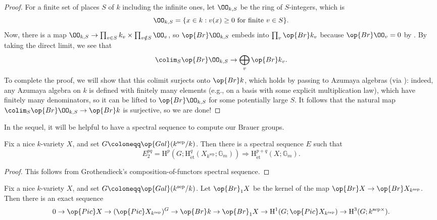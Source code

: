\documentclass[../notes.tex]{subfiles}
\begin{document}
\begin{proof}
	For a finite set of places $S$ of $k$ including the infinite ones, let $\OO_{k,S}$ be the ring of $S$-integers, which is
	\[\OO_{k,S}=\{x\in k:v(x)\ge0\text{ for finite }v\in S\}.\]
	Now, there is a map $\OO_{k,S}\to\prod_{v\in S}k_{v}\times\prod_{v\notin S}\OO_v$, so $\op{Br}\OO_{k,S}$ embeds into $\prod_v\op{Br}k_v$ because $\op{Br}\OO_v=0$ by . By taking the direct limit, we see that
	\[\colim_S\op{Br}\OO_{k,S}\to\bigoplus_{v}\op{Br}k_v.\]
	To complete the proof, we will show that this colimit surjects onto $\op{Br}k$, which holds by passing to Azumaya algebras (via ): indeed, any Azumaya algebra on $k$ is defined with finitely many elements (e.g., on a basis with some explicit multiplication law), which have finitely many denominators, so it can be lifted to $\op{Br}\OO_{k,S}$ for some potentially large $S$. It follows that the natural map $\colim_S\op{Br}\OO_{k,S}\to\op{Br}k$ is surjective, so we are done!
\end{proof}
In the sequel, it will be helpful to have a spectral sequence to compute our Brauer groups.
\begin{theorem} \label{thm:h-s-spectral}
	Fix a nice $k$-variety $X$, and set $G\coloneqq\op{Gal}(k^{\mathrm{sep}}/k)$. Then there is a spectral sequence $E$ such that
	\[E_2^{pq}=\mathrm H^p\left(G;\mathrm H^q_{\mathrm{\acute et}}(X_{k^{\mathrm{sep}}};\mathbb G_m)\right)\Rightarrow\mathrm H^{p+q}_{\mathrm{\acute et}}(X;\mathbb G_m).\]
\end{theorem}
\begin{proof}
	This follows from Grothendieck's composition-of-functors spectral sequence.
\end{proof}
\begin{corollary} \label{cor:brauer-les}
	Fix a nice $k$-variety $X$, and set $G\coloneqq\op{Gal}(k^{\mathrm{sep}}/k)$. Let $\op{Br}_1X$ be the kernel of the map $\op{Br}X\to\op{Br}X_{k^{\mathrm{sep}}}$. Then there is an exact sequence
	\[0\to\op{Pic}X\to(\op{Pic}X_{k^{\mathrm{sep}}})^G\to\op{Br}k\to\op{Br}_1X\to\mathrm H^1(G;\op{Pic}X_{k^{\mathrm{sep}}})\to\mathrm H^3(G;k^{\mathrm{sep}\times}).\]
\end{corollary}
\end{document}
